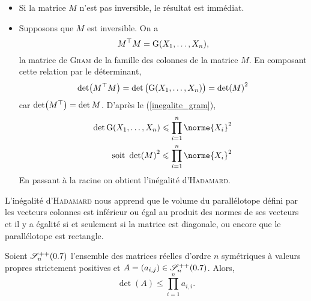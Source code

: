 \begin{preuve}
    \begin{itemize}
        \item Si la matrice $M$ n'est pas inversible, le résultat est immédiat. 
        \item Supposons que $M$ est inversible. On a 
        $$M^\top M = \mathrm{G}(X_1, \dots, X_n),$$ 
        la matrice de \textsc{Gram} de la famille des colonnes de la matrice $M$. 
        En composant cette relation par le déterminant, 
        $$\det(M^\top M) = \det \big( \mathrm{G}(X_1, \dots, X_n) \big) = \det(M)^2 $$
        car $\det(M^\top) = \det M$.
        D'après le (\ref{inegalite_gram}), 
        \begin{align*}
            \det \Gram(X_1, \dots, X_n) &\leqslant \prod_{i=1}^n \norme{X_i}^2 \\
            \text{soit } \det (M)^2 &\leqslant \prod_{i=1}^n \norme{X_i}^2
        \end{align*}
        En passant à la racine on obtient l'inégalité d'\textsc{Hadamard}.
    \end{itemize}
\end{preuve}


L'inégalité d'\textsc{Hadamard} nous apprend que le volume du parallélotope défini par les vecteurs colonnes est inférieur ou égal au produit des normes de ses vecteurs et il y a égalité si et seulement si la matrice est diagonale, ou encore que le parallélotope est rectangle. 

\begin{prop}{}
    Soient $\mathscr{S}_n ^{++} (0.7)$ l'ensemble des matrices réelles d'ordre $n$ symétriques à valeurs propres strictement positives et $A = (a_{i,j}) \in \mathscr{S}_n ^{++} (0.7)$. Alors,
    $$\det(A) \leqslant \prod_{i=1}^{n} a_{i,i}.$$
\end{prop}

